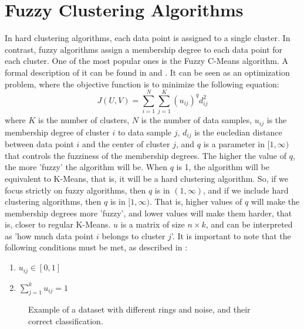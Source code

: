 \documentclass[conference]{IEEEtran}
\begin{document}
\section{Fuzzy Clustering Algorithms}
In hard clustering algorithms, each data point is assigned to a single cluster. In contrast, fuzzy algorithms assign a membership degree to each data point for each cluster.
One of the most popular ones is the Fuzzy C-Means algorithm. A formal description of it can be found in \cite{bookpatternrecognition} and \cite{BEZDEK1984191}. It can be seen as an optimization problem,
where the objective function is to minimize the following equation:
\begin{equation}
J(U, V) = \sum_{i=1}^{N} \sum_{j=1}^{K} (u_{ij})^q d_{ij}^2
\end{equation}
where $K$ is the number of clusters, $N$ is the number of data samples, $u_{ij}$ is the membership degree of cluster $i$ to data sample $j$,
$d_{ij}$ is the eucledian distance between data point $i$ and the center of cluster $j$, and $q$ is a parameter in $[1, \infty)$ that controls the fuzziness of the membership degrees.
The higher the value of $q$, the more 'fuzzy' the algorithm will be. When $q$ is 1, the algorithm will be equivalent to K-Means, that is, it will be a hard clustering algorithm.
So, if we focus strictly on fuzzy algorithms, then $q$ is in $(1, \infty)$, and if we include hard clustering algorithms, then $q$ is in $[1, \infty)$.
That is, higher values of $q$ will make the membership degrees more 'fuzzy', and lower values will make them harder, that is, closer to regular K-Means.
$u$ is a matrix of size $n \times k$, and can be interpreted as 'how much data point $i$ belongs to cluster $j$'.
It is important to note that the following conditions must be met, as described in \cite{BEZDEK1984191}:
\begin{enumerate}
    \item $u_{ij} \in [0, 1]$
    \item $\sum_{j=1}^{k} u_{ij} = 1$
\end{enumerate}

\begin{figure}[H]
    \centering
    \resizebox{0.9\linewidth}{!}{}
    \label{fig:noisy_rings}
    \caption{Example of a dataset with different rings and noise, and their correct classification.}
\end{figure}
\end{document}
